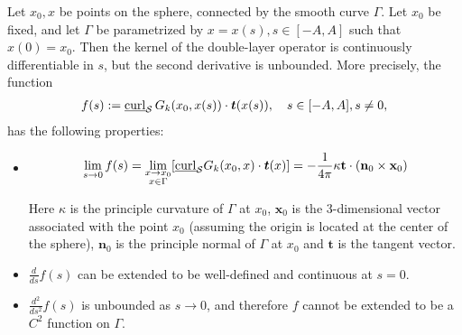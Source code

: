 \begin{lemma}
\label{regularity}
Let $x_0,x$ be points on the sphere, connected by the smooth curve
$\Gamma$. Let $x_0$ be fixed, and let $\Gamma$ be parametrized by
$x=x(s), s\in[-A,A]$ such that $x(0)=x_{0}$. Then the kernel of the
double-layer operator is continuously differentiable in $s$, but the
second derivative is unbounded. More precisely, the function 
\begin{align*}
  f(s):=\underline{\mbox{curl}}_{\S}\,
    G_{k}(x_0,x(s))\cdot\vec{t}(x(s)), \quad s\in[-A,A], s \neq 0,
\end{align*}
has the following properties:
\begin{itemize}
\item 
\begin{align*} 
  \lim_{\substack {s \rightarrow 0}} f(s) = 
   \lim_{\substack {x \rightarrow x_{0} \\ x \in \Gamma}}
   [\underline{\mbox{curl}}_{\S}G_{k}(x_{0},x) \cdot \vec{t}(x)] =  
   -\frac{1}{4\pi} \kappa \mathbf{t}\cdot(\mathbf{n}_{0}
    \times \mathbf{x}_0)
\end{align*}

Here $\kappa$ is the principle curvature of $\Gamma$ at $x_{0}$,
$\mathbf{x}_0$ is the 3-dimensional vector associated with the point
$x_{0}$ (assuming the origin is located at the center of the sphere),
$\mathbf{n}_{0}$ is the principle normal of $\Gamma$ at $x_0$ and
$\mathbf{t}$ is the tangent vector.
\item $\frac{d}{ds}f(s)$ can be extended to be well-defined and
continuous at $s=0$.
\item $\frac{d^2}{ds^2} f(s)$ is unbounded as $s\rightarrow 0$, and
therefore $f$ cannot be extended to be a $C^{2}$ function on $\Gamma$.
\end{itemize}
\end{lemma}

